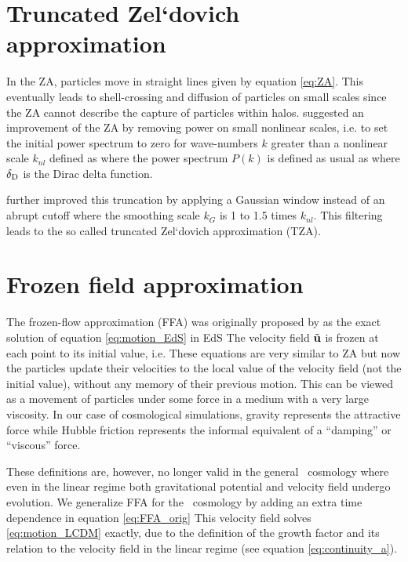 \section{Truncated Zel`dovich approximation}
In the ZA, particles move in straight lines given by equation \eqref{eq:ZA}. This eventually leads to shell-crossing and diffusion of particles on small scales since the ZA cannot describe the capture of particles within halos. \textcite{doi:10.1093/mnras/260.4.765} suggested an improvement of the ZA by removing power on small nonlinear scales, i.e. to set the initial power spectrum to zero for wave-numbers $k$ greater than a nonlinear scale $k_{nl}$ defined as
where the power spectrum $P(k)$ is defined as usual as
where $\delta_{\rm D}$ is the Dirac delta function.

\textcite{doi:10.1093/mnras/269.3.626} further improved this truncation by applying a Gaussian window instead of an abrupt cutoff
where the smoothing scale $k_{G}$ is 1 to 1.5 times $k_{nl}$. This filtering leads to the so called truncated Zel`dovich approximation (TZA).
\section{Frozen field approximation}
The frozen-flow approximation (FFA) was originally proposed by \textcite{Matarrese:1992be} as the exact solution of equation \eqref{eq:motion_EdS} in EdS
The velocity field $\tilde{\mathbf u}$ is frozen at each point to its initial value, i.e.
These equations are very similar to ZA but now the particles update their velocities to the local value of the velocity field (not the initial value), without any memory of their previous motion. This can be viewed as a movement of particles under some force in a medium with a very large viscosity. In our case of cosmological simulations, gravity represents the attractive force while Hubble friction represents the informal equivalent of a ``damping'' or ``viscous'' force.

These definitions are, however, no longer valid in the general \LCDM\ cosmology where even in the linear regime both gravitational potential and velocity field undergo evolution. We generalize FFA for the \LCDM\ cosmology by adding an extra time dependence in equation \eqref{eq:FFA_orig}
This velocity field solves \eqref{eq:motion_LCDM} exactly, due to the definition of the growth factor and its relation to the velocity field in the linear regime (see equation \eqref{eq:continuity_a}).

